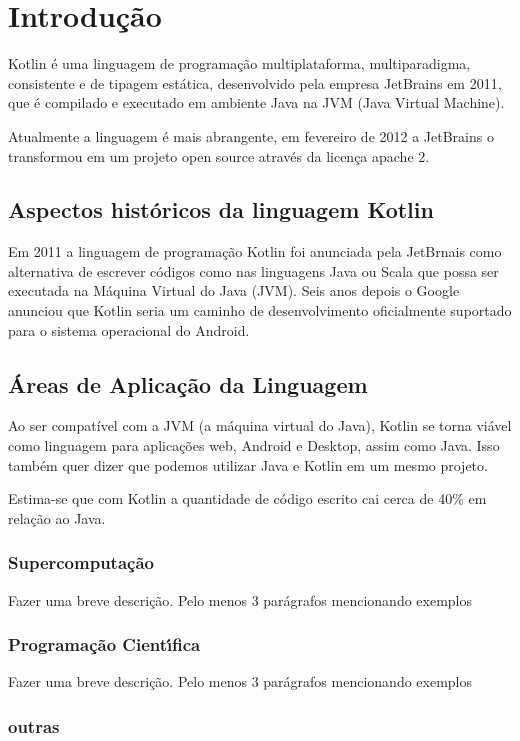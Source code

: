 

\chapter{ Introdu\c{c}\~{a}o}

Kotlin é uma linguagem de programação multiplataforma,
multiparadigma, consistente e de tipagem estática, 
desenvolvido pela empresa JetBrains em 2011, que é
compilado e executado em ambiente Java na JVM 
(Java Virtual Machine). 

Atualmente a linguagem é mais 
abrangente, em fevereiro de 2012 a JetBrains  o transformou
em um projeto open source através da licença apache 2.


\section{Aspectos hist\'{o}ricos da linguagem Kotlin}
Em 2011 a linguagem de programaç\~{a}o Kotlin foi anunciada pela JetBrnais como alternativa
de escrever códigos como nas linguagens Java ou Scala que possa ser executada na Máquina Virtual do Java
(JVM). Seis anos depois o Google anunciou que Kotlin seria um caminho de 
desenvolvimento oficialmente suportado para o sistema operacional do Android.  
\cite{skeen2018kotlin}

\section{\'{A}reas de Aplica\c{c}\~{a}o da Linguagem}
Ao ser compatível com a JVM (a máquina virtual do Java), 
Kotlin se torna viável como linguagem para aplicações web, 
Android e Desktop, assim como Java. Isso também quer dizer 
que podemos utilizar Java e Kotlin em um mesmo projeto. 

Estima-se que com Kotlin a quantidade de código escrito
cai cerca de 40\% em relação ao Java. 

\subsection{ Supercomputa\c{c}\~{a}o}
Fazer uma breve descri\c{c}\~{a}o. Pelo menos 3 par\'{a}grafos mencionando exemplos

\subsection{ Programa\c{c}\~{a}o Cient\'{\i}fica}
Fazer uma breve descri\c{c}\~{a}o. Pelo menos 3 par\'{a}grafos mencionando exemplos

\subsection{ outras}